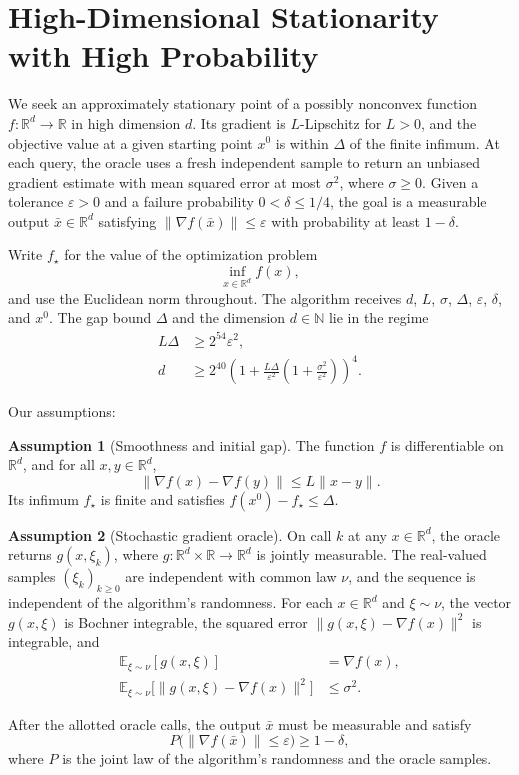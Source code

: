 \documentclass[10pt]{article}
\theoremstyle{definition}
\newtheorem{assumption}{Assumption}
\begin{document}
\section*{High-Dimensional Stationarity with High Probability}
We seek an approximately stationary point of a possibly nonconvex function $f:\mathbb{R}^d\to\mathbb{R}$ in high dimension $d$. Its gradient is $L$-Lipschitz for $L>0$, and the objective value at a given starting point $x^0$ is within $\Delta$ of the finite infimum. At each query, the oracle uses a fresh independent sample to return an unbiased gradient estimate with mean squared error at most $\sigma^2$, where $\sigma\geq 0$. Given a tolerance $\varepsilon>0$ and a failure probability $0<\delta\leq 1/4$, the goal is a measurable output $\bar{x}\in\mathbb{R}^d$ satisfying $\|\nabla f(\bar{x})\|\leq\varepsilon$ with probability at least $1-\delta$.

Write $f_\star$ for the value of the optimization problem
\[
\inf_{x\in\mathbb{R}^d} f(x),
\]
and use the Euclidean norm throughout. The algorithm receives $d$, $L$, $\sigma$, $\Delta$, $\varepsilon$, $\delta$, and $x^0$. The gap bound $\Delta$ and the dimension $d\in\mathbb{N}$ lie in the regime
\[
\begin{aligned}
L\Delta &\geq 2^{54}\varepsilon^2,\\
d &\geq 2^{40}\left(1+\frac{L\Delta}{\varepsilon^2}\left(1+\frac{\sigma^2}{\varepsilon^2}\right)\right)^4.
\end{aligned}
\]

Our assumptions:
\begin{assumption}[Smoothness and initial gap]
The function $f$ is differentiable on $\mathbb{R}^d$, and for all $x,y\in\mathbb{R}^d$,
\[
\|\nabla f(x)-\nabla f(y)\|\leq L\|x-y\|.
\]
Its infimum $f_\star$ is finite and satisfies $f(x^0)-f_\star\leq\Delta$.
\end{assumption}

\begin{assumption}[Stochastic gradient oracle]
On call $k$ at any $x\in\mathbb{R}^d$, the oracle returns $g(x,\xi_k)$, where $g:\mathbb{R}^d\times\mathbb{R}\to\mathbb{R}^d$ is jointly measurable. The real-valued samples $(\xi_k)_{k\geq 0}$ are independent with common law $\nu$, and the sequence is independent of the algorithm's randomness. For each $x\in\mathbb{R}^d$ and $\xi\sim\nu$, the vector $g(x,\xi)$ is Bochner integrable, the squared error $\|g(x,\xi)-\nabla f(x)\|^2$ is integrable, and
\[
\begin{aligned}
\mathbb{E}_{\xi\sim\nu}[g(x,\xi)] &= \nabla f(x),\\
\mathbb{E}_{\xi\sim\nu}\bigl[\|g(x,\xi)-\nabla f(x)\|^2\bigr] &\leq \sigma^2.
\end{aligned}
\]
\end{assumption}

After the allotted oracle calls, the output $\bar{x}$ must be measurable and satisfy
\[
P\bigl(\|\nabla f(\bar{x})\|\leq\varepsilon\bigr)\geq 1-\delta,
\]
where $P$ is the joint law of the algorithm's randomness and the oracle samples.
\end{document}
